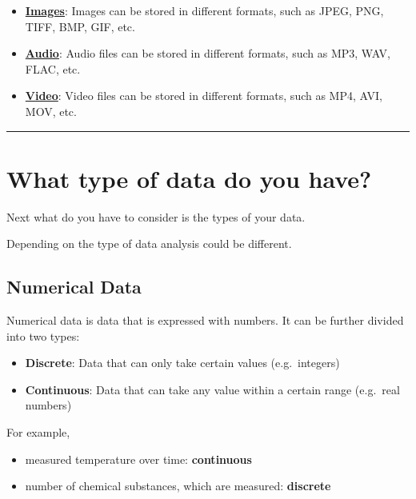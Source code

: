 \documentclass[
  letterpaper,
  DIV=11,
  numbers=noendperiod]{scrreprt}
\providecommand{\tightlist}{%
  \setlength{\itemsep}{0pt}\setlength{\parskip}{0pt}}\usepackage{longtable,booktabs,array}
\begin{document}
\begin{itemize}
\item
  \href{https://en.wikipedia.org/wiki/Image_file_formats}{\textbf{Images}}:
  Images can be stored in different formats, such as JPEG, PNG, TIFF,
  BMP, GIF, etc.
\item
  \href{https://en.wikipedia.org/wiki/Audio_file_format}{\textbf{Audio}}:
  Audio files can be stored in different formats, such as MP3, WAV,
  FLAC, etc.
\item
  \href{https://en.wikipedia.org/wiki/Video_file_format}{\textbf{Video}}:
  Video files can be stored in different formats, such as MP4, AVI, MOV,
  etc.
\end{itemize}

\begin{center}\rule{0.5\linewidth}{0.5pt}\end{center}

\section*{What type of data do you
have?}\label{what-type-of-data-do-you-have}


Next what do you have to consider is the types of your data.

Depending on the type of data analysis could be different.

\subsection*{Numerical Data}\label{numerical-data}

Numerical data is data that is expressed with numbers. It can be further
divided into two types:

\begin{itemize}
\tightlist
\item
  \textbf{Discrete}: Data that can only take certain values
  (e.g.~integers)
\item
  \textbf{Continuous}: Data that can take any value within a certain
  range (e.g.~real numbers)
\end{itemize}

For example,

\begin{itemize}
\tightlist
\item
  measured temperature over time: \textbf{continuous}
\item
  number of chemical substances, which are measured: \textbf{discrete}
\end{itemize}
\end{document}
